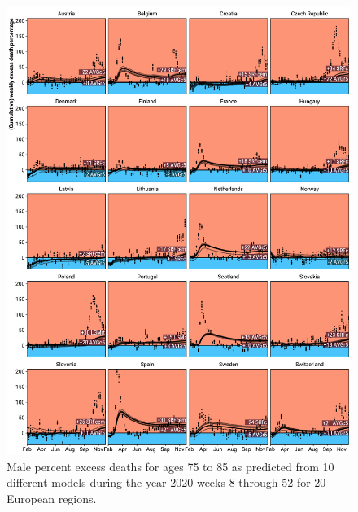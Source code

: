 \documentclass[12pt]{article}
\begin{document}
\begin{appendix}
\begin{figure}
\caption{
Male percent excess deaths for ages 75 to 85 as predicted from 10 different models during the year 2020 weeks 8 through 52 for 20 European regions.}
\label{fig:excessm75to85}
\includegraphics{excess_male__75_85_.pdf}
\end{figure}


\end{appendix}
\end{document}
